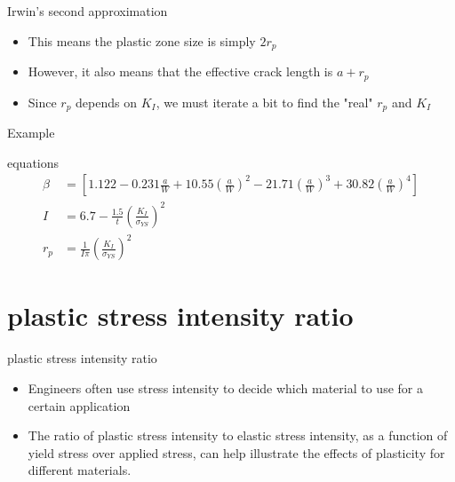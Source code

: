 \documentclass[10pt,handout]{beamer}
\begin{document}
\begin{frame}{Irwin's second approximation}
	\begin{itemize}
		\item This means the plastic zone size is simply $2r_p$
		\item However, it also means that the effective crack length is $a + r_p$
		\pause
		\item Since $r_p$ depends on $K_I$, we must iterate a bit to find the "real" $r_p$ and $K_I$
	\end{itemize}
\end{frame}

\begin{frame}{Example}
	\begin{figure}[H]
		\centering
	\end{figure}
\end{frame}

\begin{frame}{equations}
	\begin{align}
	\beta &= \left[1.122 - 0.231 \frac{a}{W} + 10.55 \left(\frac{a}{W}\right)^2 - 21.71 \left(\frac{a}{W}\right)^3 + 30.82 \left(\frac{a}{W}\right)^4\right] \tag{2.4a}\\
	I &= 6.7 - \frac{1.5}{t}\left(\frac{K_I}{\sigma_{YS}}\right)^2 \tag{4.13}\\
	r_p &= \frac{1}{I\pi} \left(\frac{K_I}{\sigma_{YS}}\right)^2 \tag{4.12}
	\end{align} 
\end{frame}

\section{plastic stress intensity ratio}

\begin{frame}{plastic stress intensity ratio}
\begin{itemize}
\item Engineers often use stress intensity to decide which material to use for a certain application
\item The ratio of plastic stress intensity to elastic stress intensity, as a function of yield stress over applied stress, can help illustrate the effects of plasticity for different materials.
\end{itemize}
\end{frame}
\end{document}
